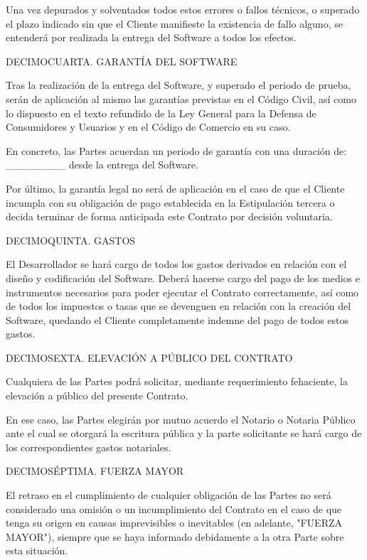 \documentclass[a4paper,11pt]{report}
\begin{document}
	Una vez depurados y solventados todos estos errores o fallos técnicos, o
	superado el plazo indicado sin que el Cliente manifieste la existencia
	de fallo alguno, se entenderá por realizada la entrega del Software a
	todos los efectos.
	
	DECIMOCUARTA. GARANTÍA DEL SOFTWARE
	
	Tras la realización de la entrega del Software, y superado el periodo de
	prueba, serán de aplicación al mismo las garantías previstas en el
	Código Civil, así como lo dispuesto en el texto refundido de la Ley
	General para la Defensa de Consumidores y Usuarios y en el Código de
	Comercio en su caso.
	
	En concreto, las Partes acuerdan un periodo de garantía con una duración
	de: \_\_\_\_\_\_\_\_ desde la entrega del Software.
	
	Por último, la garantía legal no será de aplicación en el caso de que el
	Cliente incumpla con su obligación de pago establecida en la
	Estipulación tercera o decida terminar de forma anticipada este Contrato
	por decisión voluntaria.
	
	DECIMOQUINTA. GASTOS
	
	El Desarrollador se hará cargo de todos los gastos derivados en relación
	con el diseño y codificación del Software. Deberá hacerse cargo del pago
	de los medios e instrumentos necesarios para poder ejecutar el Contrato
	correctamente, así como de todos los impuestos o tasas que se devenguen
	en relación con la creación del Software, quedando el Cliente
	completamente indemne del pago de todos estos gastos.
	
	DECIMOSEXTA. ELEVACIÓN A PÚBLICO DEL CONTRATO
	
	Cualquiera de las Partes podrá solicitar, mediante requerimiento
	fehaciente, la elevación a público del presente Contrato.
	
	En ese caso, las Partes elegirán por mutuo acuerdo el Notario o Notaria
	Público ante el cual se otorgará la escritura pública y la parte
	solicitante se hará cargo de los correspondientes gastos notariales.
	
	DECIMOSÉPTIMA. FUERZA MAYOR
	
	El retraso en el cumplimiento de cualquier obligación de las Partes no
	será considerado una omisión o un incumplimiento del Contrato en el caso
	de que tenga su origen en causas imprevisibles o inevitables (en
	adelante, "FUERZA MAYOR"), siempre que se haya informado debidamente a
	la otra Parte sobre esta situación.
	
\end{document}
